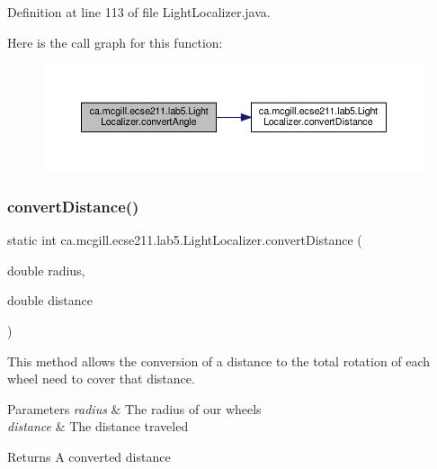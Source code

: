 Definition at line 113 of file Light\+Localizer.\+java.

Here is the call graph for this function\+:\nopagebreak
\begin{figure}[H]
\begin{center}
\leavevmode
\includegraphics[width=350pt]{classca_1_1mcgill_1_1ecse211_1_1lab5_1_1_light_localizer_ab9d7289c4badf692fd5c83635305f2c5_cgraph}
\end{center}
\end{figure}
\mbox{\label{classca_1_1mcgill_1_1ecse211_1_1lab5_1_1_light_localizer_a9eebe889aa2d4d2e881f413cc727cd9c}} 
\subsubsection{\texorpdfstring{convert\+Distance()}{convertDistance()}}
{\footnotesize\ttfamily static int ca.\+mcgill.\+ecse211.\+lab5.\+Light\+Localizer.\+convert\+Distance (\begin{DoxyParamCaption}\item[{double}]{radius,  }\item[{double}]{distance }\end{DoxyParamCaption})\hspace{0.3cm}{\ttfamily [static]}}

This method allows the conversion of a distance to the total rotation of each wheel need to cover that distance.


\begin{DoxyParams}{Parameters}
{\em radius} & The radius of our wheels \\
\hline
{\em distance} & The distance traveled \\
\hline
\end{DoxyParams}
\begin{DoxyReturn}{Returns}
A converted distance 
\end{DoxyReturn}


